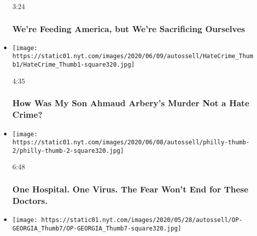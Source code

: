\begin{itemize}
  3:24

  \hypertarget{were-feeding-america-but-were-sacrificing-ourselves}{%
  \subsubsection{We're Feeding America, but We're Sacrificing
  Ourselves}\label{were-feeding-america-but-were-sacrificing-ourselves}}
\item
  \href{https://www.nytimes.com/video/opinion/100000007179746/hate-crime-bill-ahmaud-arbery.html?action=click\&module=video-series-bar\&region=header\&pgtype=Article\&playlistId=video/opinion}{}

  \texttt{[image: https://static01.nyt.com/images/2020/06/09/autossell/HateCrime\_Thumb1/HateCrime\_Thumb1-square320.jpg]}

  4:35

  \hypertarget{how-was-my-son-ahmaud-arberys-murder-not-a-hate-crime}{%
  \subsubsection{How Was My Son Ahmaud Arbery's Murder Not a Hate
  Crime?}\label{how-was-my-son-ahmaud-arberys-murder-not-a-hate-crime}}
\item
  \href{https://www.nytimes.com/video/opinion/100000007179767/coronavirus-hospital-philadelphia.html?action=click\&module=video-series-bar\&region=header\&pgtype=Article\&playlistId=video/opinion}{}

  \texttt{[image: https://static01.nyt.com/images/2020/06/08/autossell/philly-thumb-2/philly-thumb-2-square320.jpg]}

  6:48

  \hypertarget{one-hospital-one-virus-the-fear-wont-end-for-these-doctors}{%
  \subsubsection{One Hospital. One Virus. The Fear Won't End for These
  Doctors.}\label{one-hospital-one-virus-the-fear-wont-end-for-these-doctors}}
\item
  \href{https://www.nytimes.com/video/opinion/100000007161418/coronavirus-georgia-restaurant-reopening.html?action=click\&module=video-series-bar\&region=header\&pgtype=Article\&playlistId=video/opinion}{}

  \texttt{[image: https://static01.nyt.com/images/2020/05/28/autossell/OP-GEORGIA\_Thumb7/OP-GEORGIA\_Thumb7-square320.jpg]}


\end{itemize}
